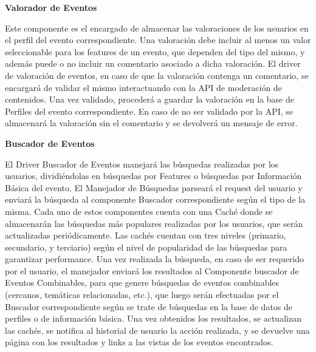 \textbf{Valorador de Eventos}

Este componente es el encargado de almacenar las valoraciones de los usuarios en el perfil del evento correspondiente. Una valoración debe incluir al menos un valor seleccionable para los features de un evento, que dependen del tipo del mismo, y además puede o no incluir un comentario asociado a dicha valoración. El driver de valoración de eventos, en caso de que la valoración contenga un comentario, se encargará de validar el mismo interactuando con la API de moderación de contenidos. Una vez validado, procederá a guardar la valoración en la base de Perfiles del evento correspondiente. En caso de no ser validado por la API, se almacenará la valoración sin el comentario y se devolverá un mensaje de error.

\textbf{Buscador de Eventos}

El Driver Buscador de Eventos manejará las búsquedas realizadas por los usuarios, dividiéndolas en búsquedas por Features o búsquedas por Información Básica del evento. El Manejador de Búsquedas parseará el request del usuario y enviará la búsqueda al componente Buscador correspondiente según el tipo de la misma. Cada uno de estos componentes cuenta con una Caché donde se almacenarán las búsquedas más populares realizadas por los usuarios, que serán actualizadas periódicamente. Las cachés cuentan con tres niveles (primario, secundario, y terciario) según el nivel de popularidad de las búsquedas para garantizar performance. Una vez realizada la búsqueda, en caso de ser requerido por el usuario, el manejador enviará los resultados al Componente buscador de Eventos Combinables, para que genere búsquedas de eventos combinables (cercanos, temáticas relacionadas, etc.), que luego serán efectuadas por el Buscador correspondiente según se trate de búsquedas en la base de datos de perfiles o de información básica. Una vez obtenidos los resultados, se actualizan las cachés, se notifica al historial de usuario la acción realizada, y se devuelve una página con los resultados y links a las vistas de los eventos encontrados.

